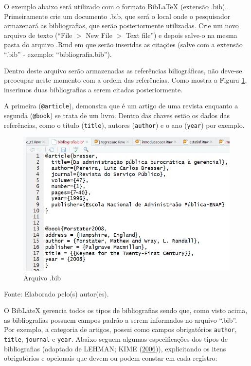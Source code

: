 \documentclass[12pt,brazil,oneside]{book}
\begin{document}
O exemplo abaixo será utilizado com o formato BibLaTeX (extensão .bib).
Primeiramente crie um documento .bib, que será o local onde o
pesquisador armazenará as bibliografias, que serão posteriormente
utilizadas. Crie um novo arquivo de texto (``File \(>\) New File \(>\)
Text file'') e depois salve-o na mesma pasta do arquivo .Rmd em que
serão inseridas as citações (salve com a extensão ``.bib'' - exemplo:
``bibliografia.bib'').

Dentro deste arquivo serão armazenadas as referências biliográficas, não
deve-se preocupar neste momento com a ordem das referências. Como mostra
a Figura \ref{fig:rmarkbib}, inserimos duas bibliografias a serem
citadas posteriormente.

A primeira (\texttt{@article}), demonstra que é um artigo de uma revista
enquanto a segunda (\texttt{@book}) se trata de um livro. Dentro das
chaves estão os dados das referências, como o título (\texttt{title}),
autores (\texttt{author}) e o ano (\texttt{year}) por exemplo.

\begin{figure}[H]

{\centering \includegraphics[width=0.6\linewidth]{rmarkbib} 

}

\caption{Arquivo .bib}\label{fig:rmarkbib}
\end{figure}

Fonte: Elaborado pelo(s) autor(es).

O BibLateX gerencia todos os tipos de bibliografias sendo que, como
visto acima, as bibliografias possuem campos padrão a serem informados
no arquivo ``.bib''. Por exemplo, a categoria de artigos, possui como
campos obrigatórios \texttt{author}, \texttt{title}, \texttt{journal} e
\texttt{year}. Abaixo seguem algumas especificações dos tipos de
bibliografias (adaptado de LEHMAN; KIME
(\protect\hyperlink{ref-biblatex}{2006})), explicitando os itens
obrigatórios e opcionais que devem ou podem constar em cada registro:
\end{document}
